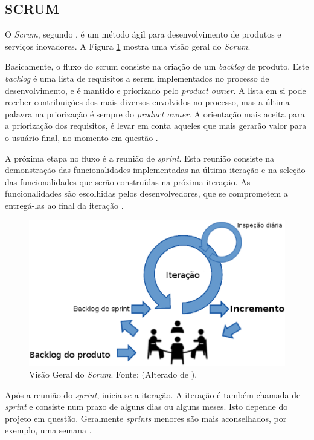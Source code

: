 \subsection{SCRUM}
\label{scrum_sec}

O \emph{Scrum}, segundo , é um método ágil para desenvolvimento de produtos e serviços inovadores. 
A Figura \ref{scrum_geral} mostra uma visão geral do \emph{Scrum}.


Basicamente, o fluxo do scrum consiste na criação de um \emph{backlog} de produto. 
Este \emph{backlog} é uma lista de requisitos a serem implementados no processo de desenvolvimento, e é mantido e priorizado pelo \emph{product owner}. 
A lista em si pode receber contribuições dos mais diversos envolvidos no processo, mas a última palavra na priorização é sempre do \emph{product owner}.
A orientação mais aceita para a priorização dos requisitos, é levar em conta aqueles que mais gerarão valor para o usuário final, no momento em questão \cite{Schwaber2001}.

A próxima etapa no fluxo é a reunião de \emph{sprint}. 
Esta reunião consiste na demonstração das funcionalidades implementadas na última iteração e na seleção das funcionalidades que serão construídas na próxima iteração.
As funcionalidades são escolhidas pelos desenvolvedores, que se comprometem a entregá-las ao final da iteração \cite{Schwaber2004}.


\begin{figure}[H]
	\centering
	\includegraphics[width=15cm]{figuras/scrum_geral.eps}
	\caption{Visão Geral do \emph{Scrum}. Fonte: (Alterado de ).}
	\label{scrum_geral}
\end{figure}



Após a reunião do \emph{sprint}, inicia-se a iteração. A iteração é também chamada de \emph{sprint} e consiste num prazo de alguns dias ou alguns meses. 
Isto depende do projeto em questão. Geralmente \emph{sprints} menores são mais aconselhados, por exemplo, uma semana  \cite{Schwaber2004}.

